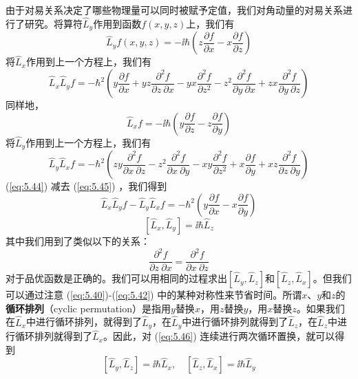     由于对易关系决定了哪些物理量可以同时被赋予定值，我们对角动量的对易关系进行了研究。将算符$\hat{L}_y$作用到函数$f\left(x,y,z\right)$上，我们有
    \begin{equation*}
        \hat{L}_yf\left(x,y,z\right) = -\ii \hbar\left(z\frac{\partial f}{\partial x} - x\frac{\partial f}{\partial z}\right)
    \end{equation*}
    将$\hat{L}_x$作用到上一个方程上，我们有
    \begin{equation}
        \hat{L}_x\hat{L}_yf = -\hbar^2\left(y\frac{\partial f}{\partial x} + yz \frac{\partial^2f}{\partial z \: \partial x} - yx\frac{\partial^2f}{\partial z^2} - z^2\frac{\partial ^2f}{\partial y \: \partial x} + zx\frac{\partial^2f}{\partial y\: \partial z}\right)
        \label{eq:5.44}
    \end{equation}
    同样地，
    \begin{equation*}
        \hat{L}_xf = -\ii \hbar\left(y\frac{\partial f}{\partial z} - z\frac{\partial f}{\partial y}\right)
    \end{equation*}
    将$\hat{L}_y$作用到上一个方程上，我们有
    \begin{equation}
        \hat{L}_y\hat{L}_xf = -\hbar^2\left(zy\frac{\partial^2f}{\partial x\: \partial z}  - z^2\frac{\partial ^2f}{\partial x \: \partial y} - xy\frac{\partial^2f}{\partial z^2} + x\frac{\partial f}{\partial y} + xz \frac{\partial^2f}{\partial z \: \partial y}\right)
        \label{eq:5.45}
    \end{equation}
    (\ref{eq:5.44}) 减去 (\ref{eq:5.45}) ，我们得到
    \begin{equation*}
        \hat{L}_x\hat{L}_yf - \hat{L}_y\hat{L}_xf = -\hbar^2\left(y\frac{\partial f}{\partial x} - x\frac{\partial f}{\partial y}\right)
    \end{equation*}
    \begin{equation}
        \left[\hat{L}_x, \hat{L}_y\right] = \ii \hbar\hat{L}_z
        \label{eq:5.46}
    \end{equation}
    其中我们用到了类似以下的关系：
    \begin{equation}
        \boxed{
            \frac{\partial ^2f}{\partial z \: \partial x} = \frac{\partial ^2f}{\partial x \: \partial z}
        }
        \label{eq:5.47}
    \end{equation}
    对于品优函数是正确的。我们可以用相同的过程求出$\left[\hat{L}_y, \hat{L}_z\right]$和$\left[\hat{L}_z, \hat{L}_x\right]$。但我们可以通过注意 (\ref{eq:5.40})-(\ref{eq:5.42}) 中的某种对称性来节省时间。所谓$x$、$y$和$z$的\textbf{循环排列}（cyclic permutation）是指用$y$替换$x$，用$z$替换$y$，用$x$替换$z$。如果我们在$\hat{L}_x$中进行循环排列，就得到了$\hat{L}_y$，在$\hat{L}_y$中进行循环排列就得到了$\hat{L}_z$，在$\hat{L}_z$中进行循环排列就得到了$\hat{L}_x$。因此，对 (\ref{eq:5.46}) 连续进行两次循环置换，就可以得到
    \begin{equation}
        \left[\hat{L}_y, \hat{L}_z\right] = \ii \hbar\hat{L}_x, \quad \left[\hat{L}_z, \hat{L}_x\right] = \ii \hbar\hat{L}_y
        \label{eq:5.48}
    \end{equation}


